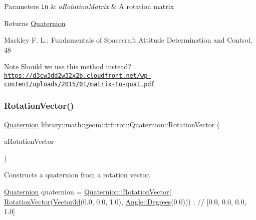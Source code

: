 \begin{DoxyParams}[1]{Parameters}
\mbox{\tt in}  & {\em a\+Rotation\+Matrix} & A rotation matrix \\
\hline
\end{DoxyParams}
\begin{DoxyReturn}{Returns}
\hyperlink{classlibrary_1_1math_1_1geom_1_1trf_1_1rot_1_1_quaternion}{Quaternion} 
\end{DoxyReturn}
Markley F. L.\+: Fundamentals of Spacecraft Attitude Determination and Control, 48 \begin{DoxyNote}{Note}
Should we use this method instead? \href{https://d3cw3dd2w32x2b.cloudfront.net/wp-content/uploads/2015/01/matrix-to-quat.pdf}{\tt https\+://d3cw3dd2w32x2b.\+cloudfront.\+net/wp-\/content/uploads/2015/01/matrix-\/to-\/quat.\+pdf} 
\end{DoxyNote}
\mbox{\label{classlibrary_1_1math_1_1geom_1_1trf_1_1rot_1_1_quaternion_ad2785ba5b5d632a1953dcd95124e0132}} 
\subsubsection{\texorpdfstring{Rotation\+Vector()}{RotationVector()}}
{\footnotesize\ttfamily \hyperlink{classlibrary_1_1math_1_1geom_1_1trf_1_1rot_1_1_quaternion}{Quaternion} library\+::math\+::geom\+::trf\+::rot\+::\+Quaternion\+::\+Rotation\+Vector (\begin{DoxyParamCaption}\item[{const \hyperlink{classlibrary_1_1math_1_1geom_1_1trf_1_1rot_1_1_rotation_vector}{rot\+::\+Rotation\+Vector} \&}]{a\+Rotation\+Vector }\end{DoxyParamCaption})\hspace{0.3cm}{\ttfamily [static]}}



Constructs a quaternion from a rotation vector. 


\begin{DoxyCode}
\hyperlink{classlibrary_1_1math_1_1geom_1_1trf_1_1rot_1_1_quaternion_aa7f459a08f5af38b9f7676a6bf36a21c}{Quaternion} quaternion = \hyperlink{classlibrary_1_1math_1_1geom_1_1trf_1_1rot_1_1_quaternion_ad2785ba5b5d632a1953dcd95124e0132}{Quaternion::RotationVector}(
      \hyperlink{classlibrary_1_1math_1_1geom_1_1trf_1_1rot_1_1_quaternion_ad2785ba5b5d632a1953dcd95124e0132}{RotationVector}(\hyperlink{namespacelibrary_1_1math_1_1obj_a977e84e9bf317a4e7dd9d6d671d6da2f}{Vector3d}(0.0, 0.0, 1.0), \hyperlink{classlibrary_1_1math_1_1geom_1_1_angle_a64aa53e8420aeb6f671d86c65c370bc8}{Angle::Degrees}(0.0))) ; \textcolor{comment}{//
       [0.0, 0.0, 0.0, 1.0]}
\end{DoxyCode}



